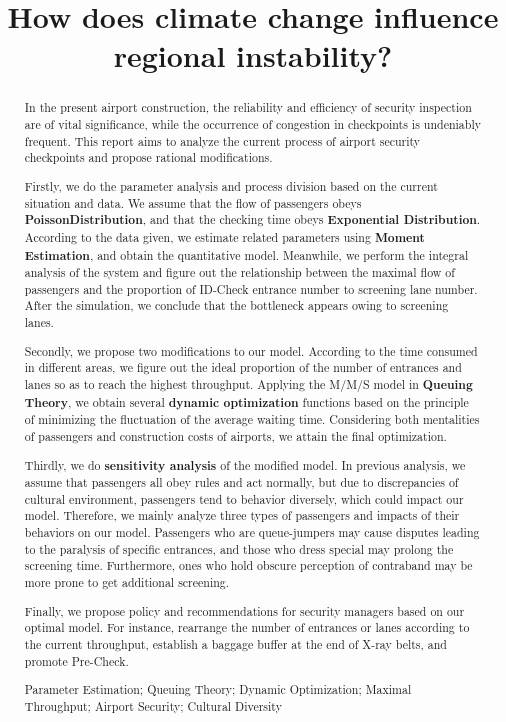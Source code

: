 \documentclass{mcmthesis}
\title{How does climate change influence regional instability?}
\author{}
\date{}
\begin{document}
	\begin{abstract}
		In the present airport construction, the reliability and efficiency of security inspection are of vital significance, while the occurrence of congestion in checkpoints is undeniably frequent. This report aims to analyze the current process of airport security checkpoints and propose rational modifications.
		
		Firstly, we do the parameter analysis and process division based on the current situation and data. We assume that the flow of passengers obeys \textbf{PoissonDistribution}, and that the checking time obeys \textbf{Exponential Distribution}. According to the data given, we estimate related parameters using \textbf{Moment Estimation}, and obtain the quantitative model. Meanwhile, we perform the integral analysis of the system and figure out the relationship between the maximal flow of passengers and the proportion of ID-Check entrance number to screening lane number. After the simulation, we conclude that the bottleneck appears owing to screening lanes.
		
		Secondly, we propose two modifications to our model. According to the time consumed in different areas, we figure out the ideal proportion of the number of entrances and lanes so as to reach the highest throughput. Applying the M/M/S model in \textbf{Queuing Theory}, we obtain several \textbf{dynamic optimization} functions based on the principle of minimizing the fluctuation of the average waiting time. Considering both mentalities of passengers and construction costs of airports, we attain the final optimization. 
		
		Thirdly, we do \textbf{sensitivity analysis} of the modified model. In previous analysis, we assume that passengers all obey rules and act normally, but due to discrepancies of cultural environment, passengers tend to behavior diversely, which could impact our model. Therefore, we mainly analyze three types of passengers and impacts of their behaviors on our model. Passengers who are queue-jumpers may cause disputes leading to the paralysis of specific entrances, and those who dress special may prolong the screening time. Furthermore, ones who hold obscure perception of contraband may be more prone to get additional screening.
		
		Finally, we propose policy and recommendations for security managers based on our optimal model. For instance, rearrange the number of entrances or lanes according to the current throughput, establish a baggage buffer at the end of X-ray belts, and promote Pre-Check.
		
		
		
		\begin{keywords}
			Parameter Estimation; Queuing Theory; Dynamic Optimization; Maximal Throughput; Airport Security; Cultural Diversity
		\end{keywords}
	\end{abstract}
	\maketitle
	
\end{document}
